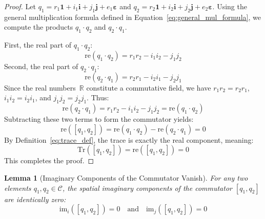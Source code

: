 \documentclass[11pt,a4paper]{book}
\newtheorem{lemma}[theorem]{Lemma}
\begin{document}
\begin{proof}
Let $q_1 = r_1\mathbf{1} + i_1\mathbf{i} + j_1\mathbf{j} + e_1\boldsymbol{\varepsilon}$ and $q_2 = r_2\mathbf{1} + i_2\mathbf{i} + j_2\mathbf{j} + e_2\boldsymbol{\varepsilon}$.
Using the general multiplication formula defined in Equation~\ref{eq:general_mul_formula}, we compute the products $q_1 \cdot q_2$ and $q_2 \cdot q_1$.

First, the real part of $q_1 \cdot q_2$:
\begin{equation}
\text{re}(q_1 \cdot q_2) = r_1 r_2 - i_1 i_2 - j_1 j_2
\end{equation}
Second, the real part of $q_2 \cdot q_1$:
\begin{equation}
\text{re}(q_2 \cdot q_1) = r_2 r_1 - i_2 i_1 - j_2 j_1
\end{equation}
Since the real numbers~$\mathbb{R}$ constitute a commutative field, we have $r_1 r_2 = r_2 r_1$, $i_1 i_2 = i_2 i_1$, and $j_1 j_2 = j_2 j_1$. 
Thus:
\begin{equation}
\text{re}(q_2 \cdot q_1) = r_1 r_2 - i_1 i_2 - j_1 j_2 = \text{re}(q_1 \cdot q_2)
\end{equation}
Subtracting these two terms to form the commutator yields:
\begin{equation}
\text{re}([q_1, q_2]) = \text{re}(q_1 \cdot q_2) - \text{re}(q_2 \cdot q_1) = 0
\end{equation}
By Definition~\ref{eq:trace_def}, the trace is exactly the real component, meaning:
\begin{equation}
\text{Tr}([q_1, q_2]) = \text{re}([q_1, q_2]) = 0
\end{equation}
This completes the proof.
\end{proof}

\begin{lemma}[Imaginary Components of the Commutator Vanish]
\label{lem:commutator_imaginary}
For any two elements $q_1, q_2 \in \mathcal{C}$, the spatial imaginary components of the commutator $[q_1, q_2]$ are identically zero:
\begin{equation}
\text{im}_i([q_1, q_2]) = 0 \quad \text{and} \quad \text{im}_j([q_1, q_2]) = 0
\end{equation}
\end{lemma}
\end{document}
